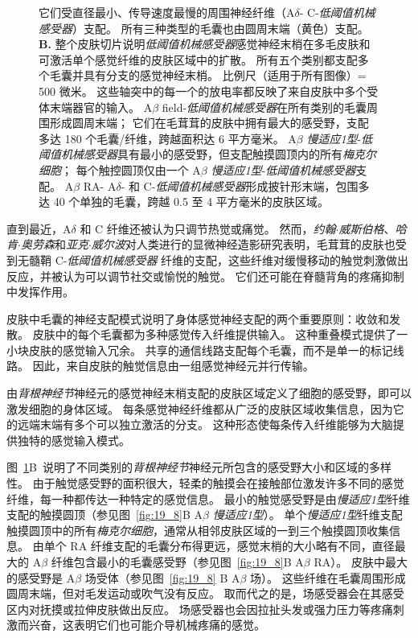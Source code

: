 \begin{figure}[htbp]
{		它们受直径最小、传导速度最慢的周围神经纤维（A$\delta$- C-\textit{低阈值机械感受器}）支配。 
		所有三种类型的毛囊也由圆周末端（黄色）支配\cite{zimmerman2014gentle}。
		\textbf{B.} 整个皮肤切片说明\textit{低阈值机械感受器}感觉神经末梢在多毛皮肤和可激活单个感觉纤维的皮肤区域中的扩散。
		所有五个类别都支配多个毛囊并具有分支的感觉神经末梢。
		比例尺（适用于所有图像）= 500 微米。 
		这些轴突中的每一个的放电率都反映了来自皮肤中多个受体末端器官的输入。
		A$\beta$ field-\textit{低阈值机械感受器}在所有类别的毛囊周围形成圆周末端；
		它们在毛茸茸的皮肤中拥有最大的感受野，支配多达 180 个毛囊/纤维，跨越面积达 6 平方毫米。
		A$\beta$ \textit{慢适应1型}-\textit{低阈值机械感受器}具有最小的感受野，但支配触摸圆顶内的所有\textit{梅克尔细胞}；
		每个触控圆顶仅由一个 A$\beta$ \textit{慢适应1型}-\textit{低阈值机械感受器}支配。
		A$\beta$ RA- A$\delta$- 和 C-\textit{低阈值机械感受器}形成披针形末端，包围多达 40 个单独的毛囊，跨越 0.5 至 4 平方毫米的皮肤区域\cite{bai2015genetic}。}
	\label{fig:18_8}
\end{figure}


直到最近，A$\delta$ 和 C 纤维还被认为只调节热觉或痛觉。
然而，\textit{约翰$\cdot$威斯伯格}、\textit{哈肯$\cdot$奥劳森}和\textit{亚克$\cdot$威尔波}对人类进行的显微神经造影研究表明，毛茸茸的皮肤也受到无髓鞘 C-\textit{低阈值机械感受器} 纤维的支配，这些纤维对缓慢移动的触觉刺激做出反应，并被认为可以调节社交或愉悦的触觉。
它们还可能在脊髓背角的疼痛抑制中发挥作用。


皮肤中毛囊的神经支配模式说明了身体感觉神经支配的两个重要原则：收敛和发散。
皮肤中的每个毛囊都为多种感觉传入纤维提供输入。
这种重叠模式提供了一小块皮肤的感觉输入冗余。
共享的通信线路支配每个毛囊，而不是单一的标记线路。 
因此，来自皮肤的触觉信息由一组感觉神经元并行传输。


由\textit{背根神经节}神经元的感觉神经末梢支配的皮肤区域定义了细胞的感受野，即可以激发细胞的身体区域。
每条感觉神经纤维都从广泛的皮肤区域收集信息，因为它的远端末端有多个可以独立激活的分支。
这种形态使每条传入纤维能够为大脑提供独特的感觉输入模式。


图~\ref{fig:18_8}B~说明了不同类别的\textit{背根神经节}神经元所包含的感受野大小和区域的多样性。
由于触觉感受野的面积很大，轻柔的触摸会在接触部位激发许多不同的感觉纤维，每一种都传达一种特定的感觉信息。
最小的触觉感受野是由\textit{慢适应1型}纤维支配的触摸圆顶（参见图~\ref{fig:19_8}B A$\beta$ \textit{慢适应1型}）。
单个\textit{慢适应1型}纤维支配触摸圆顶中的所有\textit{梅克尔细胞}，通常从相邻皮肤区域的一到三个触摸圆顶收集信息。
由单个 RA 纤维支配的毛囊分布得更远，感觉末梢的大小略有不同，直径最大的 A$\beta$ 纤维包含最小的毛囊感受野（参见图~\ref{fig:19_8}B A$\beta$ RA）。
皮肤中最大的感受野是 A$\beta$ 场受体（参见图~\ref{fig:19_8} B A$\beta$ 场）。
这些纤维在毛囊周围形成圆周末端，但对毛发运动或吹气没有反应。
取而代之的是，场感受器会在其感受区内对抚摸或拉伸皮肤做出反应。
场感受器也会因拉扯头发或强力压力等疼痛刺激而兴奋，这表明它们也可能介导机械疼痛的感觉。



